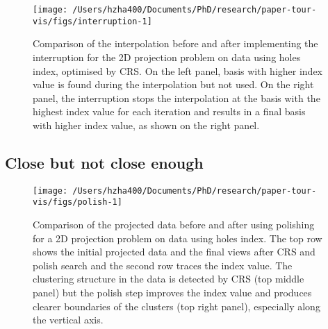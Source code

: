 \begin{Schunk}
\begin{figure}

{\centering \texttt{[image: /Users/hzha400/Documents/PhD/research/paper-tour-vis/figs/interruption-1]} 

}

\caption[Comparison of the interpolation before and after implementing the interruption for the 2D projection problem on  data using holes index, optimised by CRS]{Comparison of the interpolation before and after implementing the interruption for the 2D projection problem on  data using holes index, optimised by CRS. On the left panel, basis with higher index value is found during the interpolation but not used. On the right panel, the interruption stops the interpolation at the basis with the highest index value for each iteration and results in a final basis with higher index value, as shown on the right panel.}\label{fig:interruption}
\end{figure}
\end{Schunk}

\hypertarget{close-but-not-close-enough}{%
\subsection{Close but not close
enough}\label{close-but-not-close-enough}}

\begin{Schunk}
\begin{figure}

{\centering \texttt{[image: /Users/hzha400/Documents/PhD/research/paper-tour-vis/figs/polish-1]} 

}

\caption[Comparison of the projected data before and after using polishing for a 2D projection problem on  data using holes index]{Comparison of the projected data before and after using polishing for a 2D projection problem on  data using holes index. The top row shows the initial projected data and the final views after CRS and polish search and the second row traces the index value. The clustering structure in the data is detected by CRS (top middle panel) but the polish step improves the index value and produces clearer boundaries of the clusters (top right panel), especially along the vertical axis.}\label{fig:polish}
\end{figure}
\end{Schunk}

